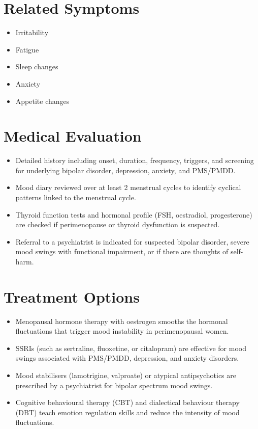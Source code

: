\section*{Related Symptoms}
\begin{itemize}
  \item Irritability
  \item Fatigue
  \item Sleep changes
  \item Anxiety
  \item Appetite changes
\end{itemize}

\section*{Medical Evaluation}
\begin{itemize}
  \item Detailed history including onset, duration, frequency, triggers, and screening for underlying bipolar disorder, depression, anxiety, and PMS/PMDD.
  \item Mood diary reviewed over at least 2 menstrual cycles to identify cyclical patterns linked to the menstrual cycle.
  \item Thyroid function tests and hormonal profile (FSH, oestradiol, progesterone) are checked if perimenopause or thyroid dysfunction is suspected.
  \item Referral to a psychiatrist is indicated for suspected bipolar disorder, severe mood swings with functional impairment, or if there are thoughts of self-harm.
\end{itemize}

\section*{Treatment Options}
\begin{itemize}
  \item Menopausal hormone therapy with oestrogen smooths the hormonal fluctuations that trigger mood instability in perimenopausal women.
  \item SSRIs (such as sertraline, fluoxetine, or citalopram) are effective for mood swings associated with PMS/PMDD, depression, and anxiety disorders.
  \item Mood stabilisers (lamotrigine, valproate) or atypical antipsychotics are prescribed by a psychiatrist for bipolar spectrum mood swings.
  \item Cognitive behavioural therapy (CBT) and dialectical behaviour therapy (DBT) teach emotion regulation skills and reduce the intensity of mood fluctuations.
\end{itemize}

